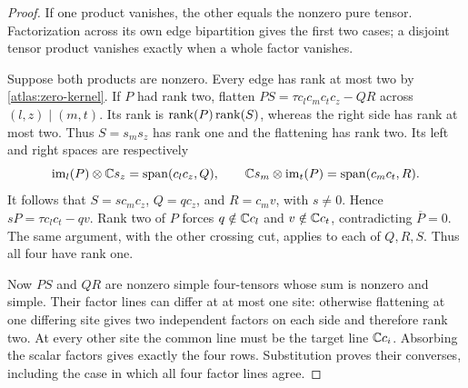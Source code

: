 \begin{proof}
If one product vanishes, the other equals the nonzero pure tensor.
Factorization across its own edge bipartition gives the first two cases;
a disjoint tensor product vanishes exactly when a whole factor vanishes.

Suppose both products are nonzero.  Every edge has rank at most two by
\eqref{atlas:zero-kernel}.  If \(P\) had rank two, flatten
\(PS=\tau c_lc_mc_tc_z-QR\) across \((l,z)\mid(m,t)\).
Its rank is \(\operatorname{rank}(P)\operatorname{rank}(S)\), whereas the right side has rank at most two.
Thus \(S=s_ms_z\) has rank one and the flattening has rank two.
Its left and right spaces are respectively
\[
 \operatorname{im}_l(P)\otimes\mathbb C s_z=\operatorname{span}(c_lc_z,Q),\qquad
 \mathbb C s_m\otimes\operatorname{im}_t(P)=\operatorname{span}(c_mc_t,R).
\]
It follows that \(S=s c_mc_z\), \(Q=q c_z\), and \(R=c_mv\), with
\(s\ne0\).  Hence \(sP=\tau c_lc_t-qv\).
Rank two of \(P\) forces \(q\notin\mathbb C c_l\) and \(v\notin\mathbb C c_t\),
contradicting \(\overline P=0\).  The same argument, with the other crossing
cut, applies to each of \(Q,R,S\).  Thus all four have rank one.

Now \(PS\) and \(QR\) are nonzero simple four-tensors whose sum is nonzero
and simple.  Their factor lines can differ at at most one site: otherwise
flattening at one differing site gives two independent factors on each side
and therefore rank two.  At every other site the common line must be the
target line \(\mathbb C c_i\).  Absorbing the scalar factors gives exactly the four
rows.  Substitution proves their converses, including the case in which all
four factor lines agree.
\end{proof}

